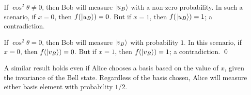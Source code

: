 \begin{solution}
    If $\cos^2\theta \neq 0$, then Bob will measure $\ket{u_B}$ with a non-zero probability. In such a scenario, if $x = 0$, then $f(\ket{u_B}) = 0$. But if $x = 1$, then $f(\ket{u_B}) = 1$; a contradiction.

    If $\cos^2\theta = 0$, then Bob will measure $\ket{v_B}$ with probability $1$. In this scenario, if $x = 0$, then $f(\ket{v_B}) = 0$. But if $x = 1$, then $f(\ket{v_B}) = 1$; a contradiction. \qed

    A similar result holds even if Alice chooses a basis based on the value of $x$, given the invariance of the Bell state. Regardless of the basis chosen, Alice will measure either basis element with probability $1/2$. 






\end{solution}